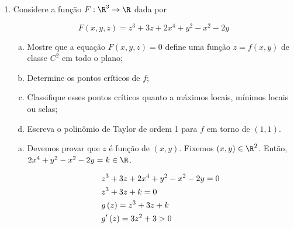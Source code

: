 \documentclass{book}
\begin{document}
\begin{enumerate}
\begin{sol}
\begin{enumerate}[(a)]
\begin{itemize}
\[
\begin{gathered}
  g'\left( x \right) =  - 6x^2  = 0 \Rightarrow x = 0 \hfill \\
  x = 2{\text{ min de }}g \hfill \\
  \boxed{f\left( {2,2} \right) =  - 16} \hfill \\
\end{gathered}
\]

      \item $f(0,y)=0,y \in \left[ {0,2} \right]$
      \item $f(2,y)=-2y^3$ tem min em $(2,2)$.
    \end{itemize}

Portanto, $(1,1)$ max global e $(2,2)$ min global.

  \end{enumerate}
\end{sol}

\newpage 

\textbf{Grupo 3: Teorema da fun\c{c}\~ao impl\'icita.}

  \item Considere a fun\c{c}\~ao $F:\R^3 \to \R$ dada por

\[
F\left( {x,y,z} \right) = z^3  + 3z + 2x^4  + y^2  - x^2  - 2y
\]


  \begin{enumerate}[(a)]
    \item Mostre que a equa\c{c}\~ao $F(x,y,z)=0$ define uma fun\c{c}\~ao $z=f(x,y)$ de classe $C^2$ em todo o plano;
    \item Determine os pontos cr\'iticos de $f$;
    \item Classifique esses pontos cr\'iticos quanto a m\'aximos locais, m\'inimos locais ou selas;
    \item Escreva o polin\^omio de Taylor de ordem 1 para $f$ em torno de $(1,1)$.
  \end{enumerate}

\begin{sol}
  \begin{enumerate}[(a)]
    \item Devemos provar que $z$ \'e fun\c{c}\~ao de $(x,y)$. Fixemos $(x,y) \in \R^2$. Ent\~ao, $2x^4  + y^2  - x^2  - 2y = k \in \R$.

\[
\begin{gathered}
  z^3  + 3z + 2x^4  + y^2  - x^2  - 2y = 0 \hfill \\
  z^3  + 3z + k = 0 \hfill \\
  g\left( z \right) = z^3  + 3z + k \hfill \\
  g'\left( z \right) = 3z^2  + 3 > 0 \hfill \\
\end{gathered}
\]


\end{enumerate}
\end{sol}
\end{enumerate}
\end{document}
